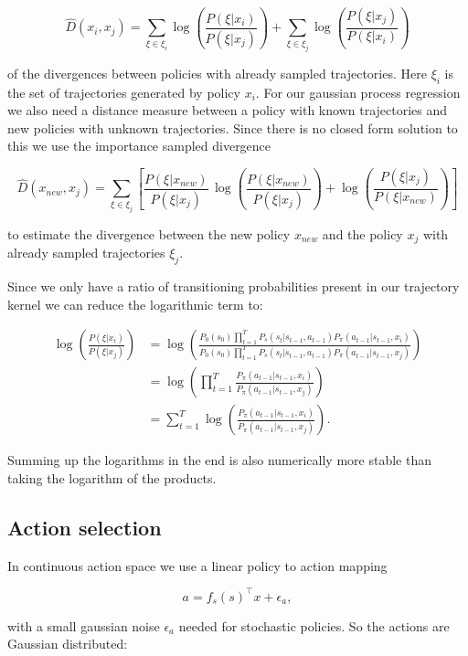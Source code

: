 $$\hat{D}(x_{ i }, x_{ j }) = \sum _{\xi \in \xi_i} \log\left( \frac{P(\xi|x_{ i })}{P(\xi|x_{ j })} \right) + \sum _{\xi \in \xi_j} \log\left( \frac{P(\xi|x_{ j })}{P(\xi|x_{ i })} \right) $$

of the divergences between policies with already sampled trajectories. Here $\xi_i$ is the set of trajectories generated by policy $x_i$. For our gaussian process regression we also need a distance measure between a policy with known trajectories and new policies with unknown trajectories. Since there is no closed form solution to this we use the importance sampled divergence

$$\hat{D}(x_{ new }, x_{ j }) = \sum _{\xi \in \xi_j} \left[\frac{P(\xi|x_{ new })}{P(\xi|x_{ j })}\,\log\left(\frac{P(\xi|x_{new})}{P(\xi|x_{j})}\right)+\log\left(\frac{P(\xi|x_{ j })}{P(\xi|x_{ new })}\right)\right] $$

to estimate the divergence between the new policy $x_{new}$ and the policy $x_j$ with already sampled trajectories $\xi_j$.

Since we only have a ratio of transitioning probabilities present in our trajectory kernel we can reduce the logarithmic term to:

\begin{align*}
    \log\left(\frac{P(\xi|x_i)}{P(\xi|x_j)}\right)
    &= \log\left(\frac{P_{0}(s_{0}) \prod_{t=1}^{T} P_s(s_{t}|s_{t-1},a_{t-1}) P_{\pi}(a_{t-1}|s_{t-1},x_i)}{P_{0}(s_{0}) \prod_{t=1}^{T} P_s(s_{t}|s_{t-1},a_{t-1}) P_{\pi}(a_{t-1}|s_{t-1},x_j)}\right)\\
    &= \log\left(\prod_{t=1}^{T}\frac{ P_{\pi}(a_{t-1}|s_{t-1},x_i)}{P_{\pi}(a_{t-1}|s_{t-1},x_j)}\right)\\
    &= \sum_{t=1}^{T} \log \left(\frac{P_{\pi}(a_{t-1}|s_{t-1},x_i)}{P_{\pi}(a_{t-1}|s_{t-1},x_j)}\right).
\end{align*}


Summing up the logarithms in the end is also numerically more stable than taking the logarithm of the products.

\subsection{Action selection}

In continuous action space we use a linear policy to action mapping

$$a = f_s(s)^\top x + \epsilon_a,$$

with a small gaussian noise $\epsilon_a$ needed for stochastic policies. So the actions are Gaussian distributed:

